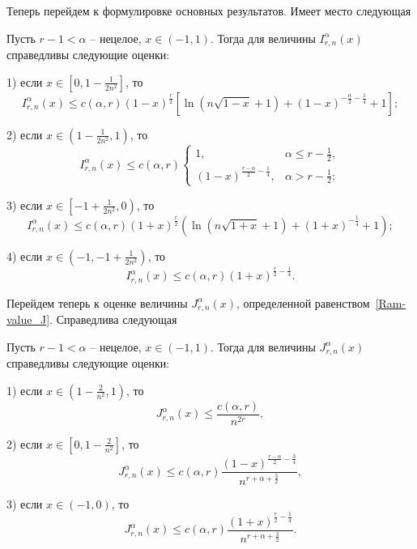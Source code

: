 Теперь перейдем к формулировке основных результатов. Имеет место следующая
\begin{theorem}\label{Ram-theo1}
	Пусть $r-1<\alpha$ -- нецелое, $x\in(-1,1)$. Тогда для величины $I_{r,n}^\alpha(x)$ справедливы следующие оценки:
	
	1) если $x\in\left[0,1-\frac{1}{2n^2}\right]$, то
	\begin{equation*}
		I_{r,n}^\alpha(x)\le c(\alpha,r)(1-x)^{\frac{r}{2}}\left[\ln(n\sqrt{1-x}+1)+(1-x)^{-\frac{\alpha}{2}-\frac14}+1\right];
	\end{equation*}
	
	2) если $x\in\left(1-\frac{1}{2n^2},1\right)$, то
	\begin{equation*}
		I_{r,n}^\alpha(x)\le c(\alpha,r)
		\begin{cases}
			1, & \alpha\le r-\frac12, \\
			(1-x)^{\frac{r-\alpha}{2}-\frac14}, & \alpha>r-\frac12;
		\end{cases}
	\end{equation*}
	
	3) если $x\in\left[-1+\frac{1}{2n^2},0\right)$, то
	\begin{equation*}
		I_{r,n}^\alpha(x)\le c(\alpha,r)(1+x)^{\frac{r}{2}}\left(\ln(n\sqrt{1+x}+1)+(1+x)^{-\frac14}+1\right);
	\end{equation*}
	
	4) если $x\in\left(-1,-1+\frac{1}{2n^2}\right)$, то
	\begin{equation*}
		I_{r,n}^\alpha(x)\le c(\alpha,r)(1+x)^{\frac{r}{2}-\frac14}.
	\end{equation*}
\end{theorem}

Перейдем теперь к оценке величины $J_{r,n}^\alpha(x)$, определенной равенством~\eqref{Ram-value_J}. Справедлива следующая

\begin{theorem}\label{Ram-theo2}
	Пусть $r-1<\alpha$ -- нецелое, $x\in(-1,1)$. Тогда для величины $J_{r,n}^\alpha(x)$ справедливы следующие оценки:
	
	1) если $x\in\left(1-\frac{2}{n^2},1\right)$, то
	\begin{equation*}\label{est_for_J1_seg}
		J_{r,n}^\alpha(x)\le \frac{c(\alpha,r)}{n^{2r}},
	\end{equation*}
	
	2) если $x\in\left[0,1-\frac{2}{n^2}\right]$, то
	\begin{equation*}
		J_{r,n}^\alpha(x)\le c(\alpha,r)\frac{(1-x)^{\frac{r-\alpha}{2}-\frac34}}{n^{r+\alpha+\frac32}},
	\end{equation*}
	
	3) если $x\in(-1,0)$, то
	\begin{equation*}
		J_{r,n}^\alpha(x)\le c(\alpha,r)\frac{(1+x)^{\frac{r}{2}-\frac14}}{n^{r+\alpha+\frac32}}.
	\end{equation*}
\end{theorem}

